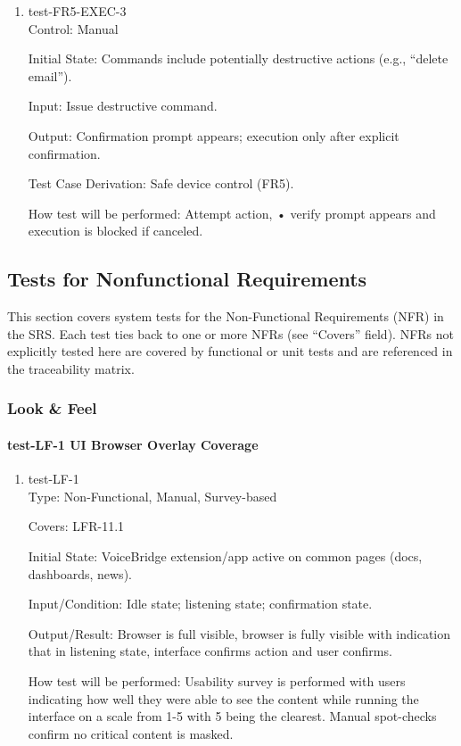 \documentclass[12pt, titlepage]{article}
\begin{document}
\begin{enumerate}
\item{test-FR5-EXEC-3\\}
Control: Manual

Initial State: Commands include potentially destructive actions (e.g., “delete email”).

Input: Issue destructive command.

Output: Confirmation prompt appears; execution only after explicit confirmation.

Test Case Derivation: Safe device control (FR5).

How test will be performed: Attempt action, 
• verify prompt appears and execution is blocked if canceled.
\end{enumerate}

\subsection{Tests for Nonfunctional Requirements}

This section covers system tests for the Non-Functional Requirements (NFR) in the SRS. Each test ties back to one or more NFRs (see “Covers” field). NFRs not explicitly tested here are covered by functional or unit tests and are referenced in the traceability matrix.

\subsubsection{Look \& Feel}

\paragraph{test-LF-1 UI Browser Overlay Coverage}

\begin{enumerate}
\item{test-LF-1\\}
Type: Non-Functional, Manual, Survey-based

Covers: LFR-11.1

Initial State: VoiceBridge extension/app active on common pages (docs, dashboards, news).

Input/Condition: Idle state; listening state; confirmation state.

Output/Result: Browser is full visible, browser is fully visible with indication that in listening state, interface confirms action and user confirms.

How test will be performed: Usability survey is performed with users indicating how well they were able to see the content while running the interface on a scale from 1-5 with 5 being the clearest. Manual spot-checks confirm no critical content is masked.
\end{enumerate}
\end{document}
